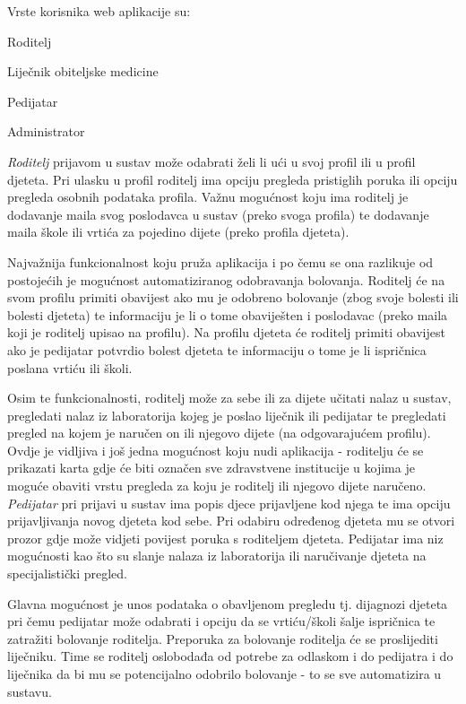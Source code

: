 		Vrste korisnika web aplikacije su:
		\begin{packed_item}
			\item Roditelj
			\item Liječnik obiteljske medicine
			\item Pedijatar
			\item Administrator
			
		\end{packed_item}
		
		
		\textit{Roditelj} prijavom u sustav može odabrati želi li ući u svoj profil ili u profil djeteta. Pri ulasku u profil roditelj ima opciju pregleda pristiglih poruka ili opciju pregleda osobnih podataka profila. Važnu mogućnost koju ima roditelj je dodavanje maila svog poslodavca u sustav (preko svoga profila) te dodavanje maila škole ili vrtića za pojedino dijete (preko profila djeteta). 
		
		Najvažnija funkcionalnost koju pruža aplikacija i po čemu se ona razlikuje od postojećih je mogućnost automatiziranog odobravanja bolovanja. Roditelj će na svom profilu primiti obavijest ako mu je odobreno bolovanje (zbog svoje bolesti ili bolesti djeteta) te informaciju je li o tome obaviješten i poslodavac (preko maila koji je roditelj upisao na profilu). Na profilu djeteta će roditelj primiti obavijest ako je pedijatar potvrdio bolest djeteta te informaciju o tome je li ispričnica poslana vrtiću ili školi.
		
		Osim te funkcionalnosti, roditelj može za sebe ili za dijete učitati nalaz u sustav, pregledati nalaz iz laboratorija kojeg je poslao liječnik ili pedijatar te pregledati pregled na kojem je naručen on ili njegovo dijete (na odgovarajućem profilu). Ovdje je vidljiva i još jedna mogućnost koju nudi aplikacija - roditelju će se prikazati karta gdje će biti označen sve zdravstvene institucije u kojima je moguće obaviti vrstu pregleda za koju je roditelj ili njegovo dijete naručeno.\\
		
		
		\textit{Pedijatar} pri prijavi u sustav ima popis djece prijavljene kod njega te ima opciju prijavljivanja novog djeteta kod sebe. Pri odabiru određenog djeteta mu se otvori prozor gdje može vidjeti povijest poruka s roditeljem djeteta. Pedijatar ima niz mogućnosti kao što su slanje nalaza iz laboratorija ili naručivanje djeteta na specijalistički pregled. 
		
		Glavna mogućnost je unos podataka o obavljenom pregledu tj. dijagnozi djeteta pri čemu pedijatar može odabrati i opciju da se vrtiću/školi šalje ispričnica te zatražiti bolovanje roditelja. Preporuka za bolovanje roditelja će se proslijediti liječniku. Time se roditelj oslobodađa od potrebe za odlaskom i do pedijatra i do liječnika da bi mu se potencijalno odobrilo bolovanje - to se sve automatizira u sustavu.\\
		
